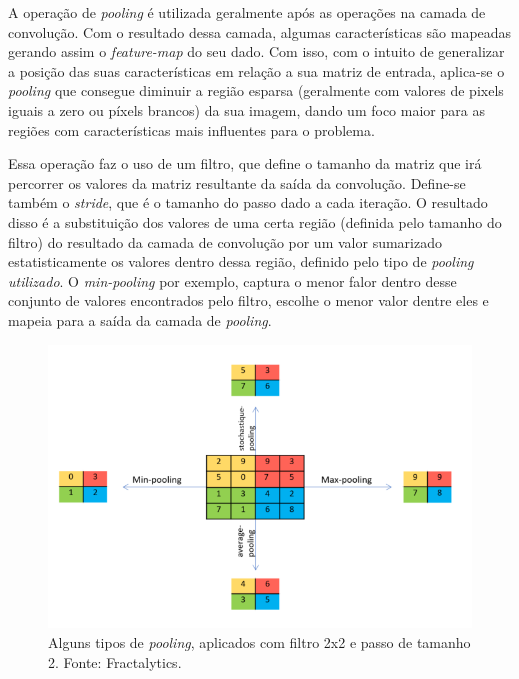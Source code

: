 
 \label{ssssec:pooling}
A operação de \textit{pooling} é utilizada geralmente após as operações na camada de convolução. Com o resultado dessa camada, algumas características são mapeadas gerando assim o \textit{feature-map} do seu dado. Com isso, com o intuito de generalizar a posição das suas características em relação a sua matriz de entrada, aplica-se o \textit{pooling} que consegue diminuir a região esparsa (geralmente com valores de pixels iguais a zero ou píxels brancos) da sua imagem, dando um foco maior para as regiões com características mais influentes para o problema.

Essa operação faz o uso de um filtro, que define o tamanho da matriz que irá percorrer os valores da matriz resultante da saída da convolução. Define-se também o \textit{stride}, que é o tamanho do passo dado a cada iteração. O resultado disso é a substituição dos valores de uma certa região (definida pelo tamanho do filtro) do resultado da camada de convolução por um valor sumarizado estatisticamente os valores dentro dessa região, definido pelo tipo de \textit{pooling utilizado}. O \textit{min-pooling} por exemplo, captura o menor falor dentro desse conjunto de valores encontrados pelo filtro, escolhe o menor valor dentre eles e mapeia para a saída da camada de \textit{pooling}.


\begin{figure}[H]
  \includegraphics[width=13cm, center]{figuras/pooling.png}
  \caption{Alguns tipos de \textit{pooling}, aplicados com filtro 2x2 e passo de tamanho 2. Fonte: Fractalytics.}
  \label{fig:pooling}
\end{figure}

